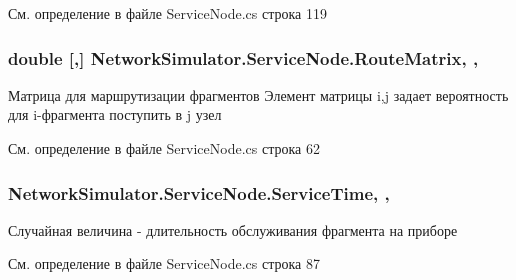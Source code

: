 См. определение в файле Service\+Node.\+cs строка 119

\subsubsection[{\texorpdfstring{Route\+Matrix}{RouteMatrix}}]{\setlength{\rightskip}{0pt plus 5cm}double \mbox{[},\mbox{]} Network\+Simulator.\+Service\+Node.\+Route\+Matrix\hspace{0.3cm}{\ttfamily [get]}, {\ttfamily [set]}, {\ttfamily [protected]}}\hypertarget{class_network_simulator_1_1_service_node_a2e789a68c35295daa0c66b1cccf40247}{}\label{class_network_simulator_1_1_service_node_a2e789a68c35295daa0c66b1cccf40247}


Матрица для маршрутизации фрагментов Элемент матрицы i,j задает вероятность для i-\/фрагмента поступить в j узел 



См. определение в файле Service\+Node.\+cs строка 62

\subsubsection[{\texorpdfstring{Service\+Time}{ServiceTime}}]{ Network\+Simulator.\+Service\+Node.\+Service\+Time\hspace{0.3cm}{\ttfamily [get]}, {\ttfamily [set]}, {\ttfamily [protected]}}\hypertarget{class_network_simulator_1_1_service_node_ad8db6aa20ec8e8ab9f53268c3a90b05d}{}\label{class_network_simulator_1_1_service_node_ad8db6aa20ec8e8ab9f53268c3a90b05d}


Случайная величина -\/ длительность обслуживания фрагмента на приборе 



См. определение в файле Service\+Node.\+cs строка 87

